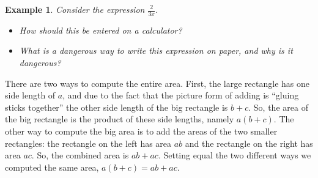 \documentclass[twoside]{tufte-handout}
\newcounter{ekcounter}%
\theoremstyle{ekimcustom}
\newtheorem{exm}[ekcounter]{Example}
\begin{document}
\begin{exm}
Consider the expression $\frac2{3x}$.
\begin{itemize}
\item How should this be entered on a calculator?
\item What is a dangerous way to write this expression on paper, and why is it dangerous?
\end{itemize}
\end{exm}
\vskip10pt


There are two ways to compute the entire area. First, the large rectangle has one side length of $a$, and due to the fact that the picture form of adding is ``gluing sticks together'' the other side length of the big rectangle is $b+c$. So, the area of the big rectangle is the product of these side lengths, namely $a(b+c)$. The other way to compute the big area is to add the areas of the two smaller rectangles: the rectangle on the left has area $ab$ and the rectangle on the right has area $ac$. So, the combined area is $ab+ac$. Setting equal the two different ways we computed the same area, $a(b+c)=ab+ac$.
\end{document}
